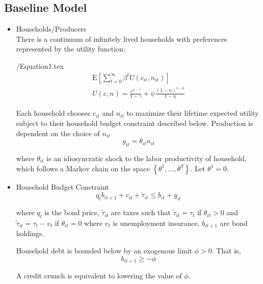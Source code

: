 \documentclass[./GL2017.tex]{subfiles}
\begin{document}
\subsection{Baseline Model}
\begin{itemize}
\item{Households/Producers}\\
There is a continuum of infinitely lived households with preferences represented by
the utility function:
\begin{verbatimwrite}{\EqDir/Equation1.tex}
	\begin{align}
		\mathrm{E}\left[\sum_{t=0}^{\infty} \beta^{t} U\left(c_{i t}, n_{i t}\right)\right]\\
		U(c, n)=\frac{c^{1-\gamma}}{1-\gamma}+\psi \frac{(1-n)^{1-\eta}}{1-\eta}
	\end{align}
\end{verbatimwrite}


Each household chooses $c_{it}$ and $n_{it}$ to maximize their lifetime expected utility  subject to their household budget constraint described below. Production is dependent on the choice of $n_{it}$
\begin{equation}
y_{i t}=\theta_{i t} n_{i t}
\end{equation}

where $ \theta_{i t}$ is an idiosyncratic shock to the labor productivity of  household, which follows a Markov chain on the space $\left\{\theta^{1}, \ldots, \theta^{S}\right\}$. Let $\theta^{1} =0$.

\item{Household Budget Constraint}\\

\begin{equation}
q_{t} b_{i t+1} +c_{i t}+\tilde{\tau}_{i t} \leq b_{i t}+y_{i t}
\end{equation}


where $q_{t}$ is the bond price, $\tilde{\tau}_{i t}$ are taxes such that $\tilde{\tau}_{i t}=\tau_{t}$ if $\theta_{i t}>0$ and $\tilde{\tau}_{i t}=\tau_{t}-v_{t}$ if $\theta_{i t}=0$ where $v_{t}$ is unemployment insurance. $b_{i t+1}$ are bond holdings.

Household debt is bounded below by an exogenous limit $\phi > 0$. That is,
\begin{equation}
b_{i t+1} \geq-\phi
\end{equation}

A credit crunch is equivalent to lowering the value of $\phi$.


\end{itemize}
\end{document}
